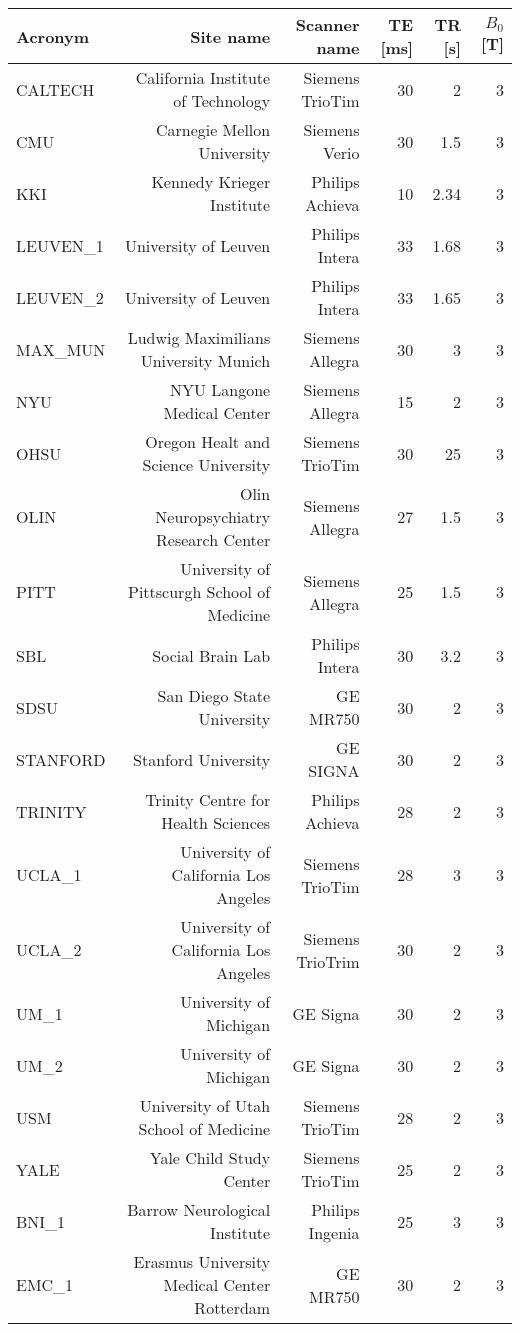 \documentclass[11pt]{report}
\begin{document}
\begin{table}[!htp]\centering
\scriptsize
\begin{tabular}{lrrrrr}\toprule
Acronym &Site name &Scanner name &TE [ms] &TR [s] &$B_0$ [T] \\\midrule
CALTECH &California Institute of Technology &Siemens TrioTim &30 &2 &3 \\
CMU &Carnegie Mellon University &Siemens Verio &30 &1.5 &3 \\
KKI &Kennedy Krieger Institute &Philips Achieva &10 &2.34 &3 \\
LEUVEN\_1 &University of Leuven &Philips Intera &33 &1.68 &3 \\
LEUVEN\_2 &University of Leuven &Philips Intera &33 &1.65 &3 \\
MAX\_MUN &Ludwig Maximilians University Munich &Siemens Allegra &30 &3 &3 \\
NYU &NYU Langone Medical Center &Siemens Allegra &15 &2 &3 \\
OHSU &Oregon Healt and Science University &Siemens TrioTim &30 &25 &3 \\
OLIN &Olin Neuropsychiatry Research Center &Siemens Allegra &27 &1.5 &3 \\
PITT &University of Pittscurgh School of Medicine &Siemens Allegra &25 &1.5 &3 \\
SBL &Social Brain Lab &Philips Intera &30 &3.2 &3 \\
SDSU &San Diego State University &GE MR750 &30 &2 &3 \\
STANFORD &Stanford University &GE SIGNA &30 &2 &3 \\
TRINITY &Trinity Centre for Health Sciences &Philips Achieva &28 &2 &3 \\
UCLA\_1 &University of California Los Angeles &Siemens TrioTim &28 &3 &3 \\
UCLA\_2 &University of California Los Angeles &Siemens TrioTrim &30 &2 &3 \\
UM\_1 &University of Michigan &GE Signa &30 &2 &3 \\
UM\_2 &University of Michigan &GE Signa &30 &2 &3 \\
USM &University of Utah School of Medicine &Siemens TrioTim &28 &2 &3 \\
YALE &Yale Child Study Center &Siemens TrioTim &25 &2 &3 \\
BNI\_1 &Barrow Neurological Institute &Philips Ingenia &25 &3 &3 \\
EMC\_1 &Erasmus University Medical Center Rotterdam &GE MR750 &30 &2 &3 \\

\end{tabular}
\end{table}
\end{document}
